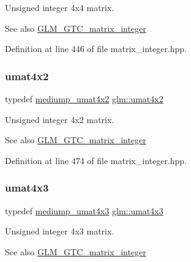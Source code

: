 Unsigned integer 4x4 matrix. \begin{DoxySeeAlso}{See also}
\mbox{\hyperlink{group__gtc__matrix__integer}{G\+L\+M\+\_\+\+G\+T\+C\+\_\+matrix\+\_\+integer}} 
\end{DoxySeeAlso}


Definition at line 446 of file matrix\+\_\+integer.\+hpp.

\mbox{\label{group__gtc__matrix__integer_ga13e8392218e9b6e1b7f194a21b5c88bf}} 
\subsubsection{\texorpdfstring{umat4x2}{umat4x2}}
{\footnotesize\ttfamily typedef \mbox{\hyperlink{group__gtc__matrix__integer_ga9dd5ce011ca43d90cf1b94084c7e90ac}{mediump\+\_\+umat4x2}} \mbox{\hyperlink{group__gtc__matrix__integer_ga13e8392218e9b6e1b7f194a21b5c88bf}{glm\+::umat4x2}}}

Unsigned integer 4x2 matrix. \begin{DoxySeeAlso}{See also}
\mbox{\hyperlink{group__gtc__matrix__integer}{G\+L\+M\+\_\+\+G\+T\+C\+\_\+matrix\+\_\+integer}} 
\end{DoxySeeAlso}


Definition at line 474 of file matrix\+\_\+integer.\+hpp.

\mbox{\label{group__gtc__matrix__integer_ga08373f5588a54da1a48e5e55c7d51004}} 
\subsubsection{\texorpdfstring{umat4x3}{umat4x3}}
{\footnotesize\ttfamily typedef \mbox{\hyperlink{group__gtc__matrix__integer_gac91ed5aa76fe160d5ab5d31e2b94d95b}{mediump\+\_\+umat4x3}} \mbox{\hyperlink{group__gtc__matrix__integer_ga08373f5588a54da1a48e5e55c7d51004}{glm\+::umat4x3}}}

Unsigned integer 4x3 matrix. \begin{DoxySeeAlso}{See also}
\mbox{\hyperlink{group__gtc__matrix__integer}{G\+L\+M\+\_\+\+G\+T\+C\+\_\+matrix\+\_\+integer}} 
\end{DoxySeeAlso}


